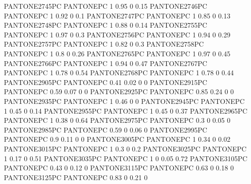  {PANTONE2745PC} {PANTONE\SpotSpace PC} {1 0.95 0 0.15}
 {PANTONE2746PC} {PANTONE\SpotSpace PC} {1 0.92 0 0.1}
 {PANTONE2747PC} {PANTONE\SpotSpace PC} {1 0.85 0 0.13}
 {PANTONE2748PC} {PANTONE\SpotSpace PC} {1 0.88 0 0.14}
 {PANTONE2755PC} {PANTONE\SpotSpace PC} {1 0.97 0 0.3}
 {PANTONE2756PC} {PANTONE\SpotSpace PC} {1 0.94 0 0.29}
 {PANTONE2757PC} {PANTONE\SpotSpace PC} {1 0.82 0 0.3}
 {PANTONE2758PC} {PANTONE\SpotSpace PC} {1 0.8 0 0.26}
 {PANTONE2765PC} {PANTONE\SpotSpace PC} {1 0.97 0 0.45}
 {PANTONE2766PC} {PANTONE\SpotSpace PC} {1 0.94 0 0.47}
 {PANTONE2767PC} {PANTONE\SpotSpace PC} {1 0.78 0 0.54}
 {PANTONE2768PC} {PANTONE\SpotSpace PC} {1 0.78 0 0.44}
 {PANTONE2905PC} {PANTONE\SpotSpace PC} {0.41 0.02 0 0}
 {PANTONE2915PC} {PANTONE\SpotSpace PC} {0.59 0.07 0 0}
 {PANTONE2925PC} {PANTONE\SpotSpace PC} {0.85 0.24 0 0}
 {PANTONE2935PC} {PANTONE\SpotSpace PC} {1 0.46 0 0}
 {PANTONE2945PC} {PANTONE\SpotSpace PC} {1 0.45 0 0.14}
 {PANTONE2955PC} {PANTONE\SpotSpace PC} {1 0.45 0 0.37}
 {PANTONE2965PC} {PANTONE\SpotSpace PC} {1 0.38 0 0.64}
 {PANTONE2975PC} {PANTONE\SpotSpace PC} {0.3 0 0.05 0}
 {PANTONE2985PC} {PANTONE\SpotSpace PC} {0.59 0 0.06 0}
 {PANTONE2995PC} {PANTONE\SpotSpace PC} {0.9 0.11 0 0}
 {PANTONE3005PC} {PANTONE\SpotSpace PC} {1 0.34 0 0.02}
 {PANTONE3015PC} {PANTONE\SpotSpace PC} {1 0.3 0 0.2}
 {PANTONE3025PC} {PANTONE\SpotSpace PC} {1 0.17 0 0.51}
 {PANTONE3035PC} {PANTONE\SpotSpace PC} {1 0 0.05 0.72}
 {PANTONE3105PC} {PANTONE\SpotSpace PC} {0.43 0 0.12 0}
 {PANTONE3115PC} {PANTONE\SpotSpace PC} {0.63 0 0.18 0}
 {PANTONE3125PC} {PANTONE\SpotSpace PC} {0.83 0 0.21 0}
